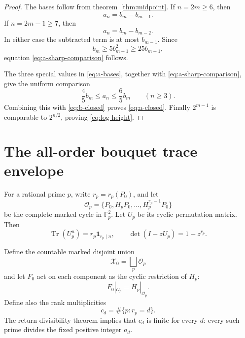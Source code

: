 \documentclass[11pt]{article}
\numberwithin{equation}{section}
\theoremstyle{remark}
\newcommand{\Tr}{\operatorname{Tr}}
\newcommand{\cO}{\mathcal O}
\newcommand{\cX}{\mathcal X}
\begin{document}
\begin{proof}
The bases follow from theorem~\ref{thm:midpoint}.  If \(n=2m\ge6\), then
\[
 a_n=b_m-b_{m-1}.
\]
If \(n=2m-1\ge7\), then
\[
 a_n=b_m-b_{m-2}.
\]
In either case the subtracted term is at most \(b_{m-1}\).  Since
\[
 b_m\ge5b_{m-1}^2\ge25b_{m-1},
\]
equation \eqref{eq:a-sharp-comparison} follows.

The three special values in \eqref{eq:a-bases}, together with
\eqref{eq:a-sharp-comparison}, give the uniform comparison
\begin{equation}
 \frac45b_m\le a_n\le\frac65b_m
 \qquad(n\ge3).
 \label{eq:a-uniform-comparison}
\end{equation}
Combining this with \eqref{eq:b-closed} proves \eqref{eq:a-closed}.
Finally \(2^{m-1}\) is comparable to \(2^{n/2}\), proving
\eqref{eq:log-height}.
\end{proof}

\section{The all-order bouquet trace envelope}

For a rational prime \(p\), write \(r_p=r_p(P_0)\), and let
\begin{equation}
 \cO_p=\{P_0,H_pP_0,\ldots,H_p^{r_p-1}P_0\}
 \label{eq:marked-cycle}
\end{equation}
be the complete marked cycle in \(\mathbb F_p^2\).  Let \(U_p\) be its cyclic
permutation matrix.  Then
\begin{equation}
 \Tr(U_p^n)=r_p\mathbf 1_{r_p\mid n},
 \qquad
 \det(I-zU_p)=1-z^{r_p}.
 \label{eq:local-cycle}
\end{equation}

Define the countable marked disjoint union
\begin{equation}
 \cX_0=\bigsqcup_p\cO_p
 \label{eq:bouquet}
\end{equation}
and let \(F_0\) act on each component as the cyclic restriction of \(H_p\):
\begin{equation}
 F_0|_{\cO_p}=H_p|_{\cO_p}.
 \label{eq:bouquet-map}
\end{equation}
Define also the rank multiplicities
\begin{equation}
 c_d=\#\{p:r_p=d\}.
 \label{eq:rank-multiplicity}
\end{equation}
The return-divisibility theorem implies that \(c_d\) is finite for every
\(d\): every such prime divides the fixed positive integer \(a_d\).
\end{document}

